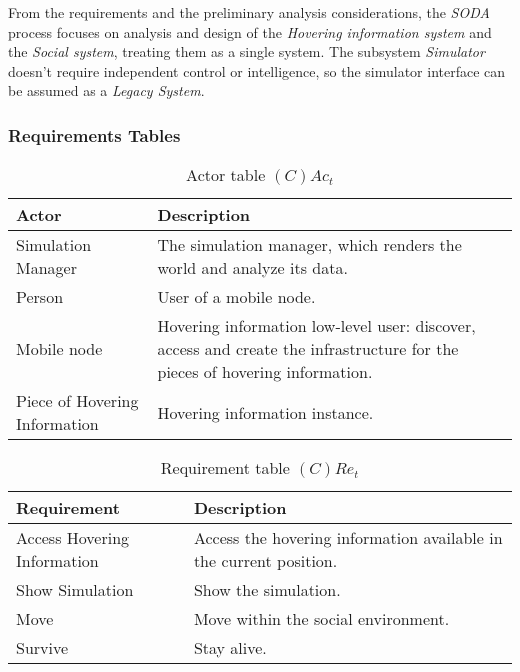 From the requirements and the preliminary analysis considerations, the
\emph{SODA} process focuses on analysis and design of the \emph{Hovering
information system} and the \emph{Social system}, treating them as a single
system. The subsystem \emph{Simulator} doesn't require independent control or
intelligence, so the simulator interface can be assumed as a \emph{Legacy
System}.

\subsubsection{Requirements Tables}

\begin{table}[H]
	\centering
	\begin{tabular}{|p{4cm}|p{8cm}|}
			\hline
			\textbf{Actor} & \textbf{Description} \\
			\hline
      Simulation Manager & The simulation manager, which renders the world and
      analyze its data. \\
			\hline
			Person & User of a mobile node. \\
			\hline
			Mobile node & Hovering information low-level user: discover, access and
			create the infrastructure for the pieces of hovering information. \\
			\hline
			Piece of Hovering Information & Hovering information instance. \\
			\hline
		\end{tabular}
	\caption{Actor table $(C)Ac_t$}
	\label{tab:cact}
\end{table}

\begin{table}[H]
	\centering
	\begin{tabular}{|p{4cm}|p{8cm}|}
			\hline
			\textbf{Requirement} & \textbf{Description} \\
			\hline
      Access Hovering Information & Access the hovering information
      available in the current position. \\
			\hline
			Show Simulation & Show the simulation. \\
			\hline
			Move & Move within the social environment. \\
			\hline
			Survive & Stay alive. \\
			\hline
		\end{tabular}
	\caption{Requirement table $(C)Re_t$}
	\label{tab:cact}
\end{table}

